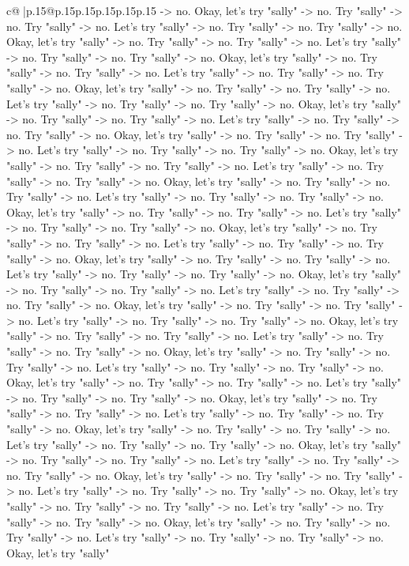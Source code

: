 \documentclass{article}
\begin{document}
{\begin{supertabular}{c@{$\;$}|p{.15\linewidth}@{}p{.15\linewidth}p{.15\linewidth}p{.15\linewidth}p{.15\linewidth}p{.15\linewidth}}
{{{{-}> no. Okay, let's try "sally" {-}> no. Try "sally" {-}> no. Try "sally" {-}> no. Let's try "sally" {-}> no. Try "sally" {-}> no. Try "sally" {-}> no. Okay, let's try "sally" {-}> no. Try "sally" {-}> no. Try "sally" {-}> no. Let's try "sally" {-}> no. Try "sally" {-}> no. Try "sally" {-}> no. Okay, let's try "sally" {-}> no. Try "sally" {-}> no. Try "sally" {-}> no. Let's try "sally" {-}> no. Try "sally" {-}> no. Try "sally" {-}> no. Okay, let's try "sally" {-}> no. Try "sally" {-}> no. Try "sally" {-}> no. Let's try "sally" {-}> no. Try "sally" {-}> no. Try "sally" {-}> no. Okay, let's try "sally" {-}> no. Try "sally" {-}> no. Try "sally" {-}> no. Let's try "sally" {-}> no. Try "sally" {-}> no. Try "sally" {-}> no. Okay, let's try "sally" {-}> no. Try "sally" {-}> no. Try "sally" {-}> no. Let's try "sally" {-}> no. Try "sally" {-}> no. Try "sally" {-}> no. Okay, let's try "sally" {-}> no. Try "sally" {-}> no. Try "sally" {-}> no. Let's try "sally" {-}> no. Try "sally" {-}> no. Try "sally" {-}> no. Okay, let's try "sally" {-}> no. Try "sally" {-}> no. Try "sally" {-}> no. Let's try "sally" {-}> no. Try "sally" {-}> no. Try "sally" {-}> no. Okay, let's try "sally" {-}> no. Try "sally" {-}> no. Try "sally" {-}> no. Let's try "sally" {-}> no. Try "sally" {-}> no. Try "sally" {-}> no. Okay, let's try "sally" {-}> no. Try "sally" {-}> no. Try "sally" {-}> no. Let's try "sally" {-}> no. Try "sally" {-}> no. Try "sally" {-}> no. Okay, let's try "sally" {-}> no. Try "sally" {-}> no. Try "sally" {-}> no. Let's try "sally" {-}> no. Try "sally" {-}> no. Try "sally" {-}> no. Okay, let's try "sally" {-}> no. Try "sally" {-}> no. Try "sally" {-}> no. Let's try "sally" {-}> no. Try "sally" {-}> no. Try "sally" {-}> no. Okay, let's try "sally" {-}> no. Try "sally" {-}> no. Try "sally" {-}> no. Let's try "sally" {-}> no. Try "sally" {-}> no. Try "sally" {-}> no. Okay, let's try "sally" {-}> no. Try "sally" {-}> no. Try "sally" {-}> no. Let's try "sally" {-}> no. Try "sally" {-}> no. Try "sally" {-}> no. Okay, let's try "sally" {-}> no. Try "sally" {-}> no. Try "sally" {-}> no. Let's try "sally" {-}> no. Try "sally" {-}> no. Try "sally" {-}> no. Okay, let's try "sally" {-}> no. Try "sally" {-}> no. Try "sally" {-}> no. Let's try "sally" {-}> no. Try "sally" {-}> no. Try "sally" {-}> no. Okay, let's try "sally" {-}> no. Try "sally" {-}> no. Try "sally" {-}> no. Let's try "sally" {-}> no. Try "sally" {-}> no. Try "sally" {-}> no. Okay, let's try "sally" {-}> no. Try "sally" {-}> no. Try "sally" {-}> no. Let's try "sally" {-}> no. Try "sally" {-}> no. Try "sally" {-}> no. Okay, let's try "sally" {-}> no. Try "sally" {-}> no. Try "sally" {-}> no. Let's try "sally" {-}> no. Try "sally" {-}> no. Try "sally" {-}> no. Okay, let's try "sally" {-}> no. Try "sally" {-}> no. Try "sally" {-}> no. Let's try "sally" {-}> no. Try "sally" {-}> no. Try "sally" {-}> no. Okay, let's try "sally" {-}> no. Try "sally" {-}> no. Try "sally" {-}> no. Let's try "sally" {-}> no. Try "sally" {-}> no. Try "sally" {-}> no. Okay, let's try "sally" {-}> no. Try "sally" {-}> no. Try "sally" {-}> no. Let's try "sally" {-}> no. Try "sally" {-}> no. Try "sally" {-}> no. Okay, let's try "sally" }}}
\end{supertabular}}
\end{document}

